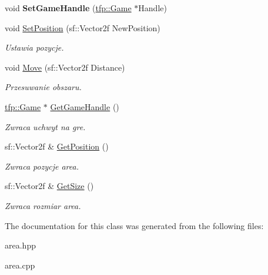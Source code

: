 \begin{DoxyCompactItemize}
\mbox{\label{classtfp_1_1_focus_area_aaf3a182051fbe50eefab80f05ab6a834}} 
void {\bfseries Set\+Game\+Handle} (\mbox{\hyperlink{classtfp_1_1_game}{tfp\+::\+Game}} $\ast$Handle)
\item 
\mbox{\label{classtfp_1_1_focus_area_a5fa3c9facfc21e8d1cb42ac62cd39034}} 
void \mbox{\hyperlink{classtfp_1_1_focus_area_a5fa3c9facfc21e8d1cb42ac62cd39034}{Set\+Position}} (sf\+::\+Vector2f New\+Position)
\begin{DoxyCompactList}\small\item\em Ustawia pozycje. \end{DoxyCompactList}\item 
\mbox{\label{classtfp_1_1_focus_area_a0c6b2e7532797ca17daa7116c23f14d6}} 
void \mbox{\hyperlink{classtfp_1_1_focus_area_a0c6b2e7532797ca17daa7116c23f14d6}{Move}} (sf\+::\+Vector2f Distance)
\begin{DoxyCompactList}\small\item\em Przesuwanie obszaru. \end{DoxyCompactList}\item 
\mbox{\label{classtfp_1_1_focus_area_ae9e1cd1259092103f03940c16a58e2ef}} 
\mbox{\hyperlink{classtfp_1_1_game}{tfp\+::\+Game}} $\ast$ \mbox{\hyperlink{classtfp_1_1_focus_area_ae9e1cd1259092103f03940c16a58e2ef}{Get\+Game\+Handle}} ()
\begin{DoxyCompactList}\small\item\em Zwraca uchwyt na gre. \end{DoxyCompactList}\item 
\mbox{\label{classtfp_1_1_focus_area_ab91af5b64947deae136419eae0d98986}} 
sf\+::\+Vector2f \& \mbox{\hyperlink{classtfp_1_1_focus_area_ab91af5b64947deae136419eae0d98986}{Get\+Position}} ()
\begin{DoxyCompactList}\small\item\em Zwraca pozycje area. \end{DoxyCompactList}\item 
\mbox{\label{classtfp_1_1_focus_area_aa90b166b997ea1d1f1e9a208d9d1f219}} 
sf\+::\+Vector2f \& \mbox{\hyperlink{classtfp_1_1_focus_area_aa90b166b997ea1d1f1e9a208d9d1f219}{Get\+Size}} ()
\begin{DoxyCompactList}\small\item\em Zwraca rozmiar area. \end{DoxyCompactList}\end{DoxyCompactItemize}


The documentation for this class was generated from the following files\+:\begin{DoxyCompactItemize}
\item 
area.\+hpp\item 
area.\+cpp\end{DoxyCompactItemize}

